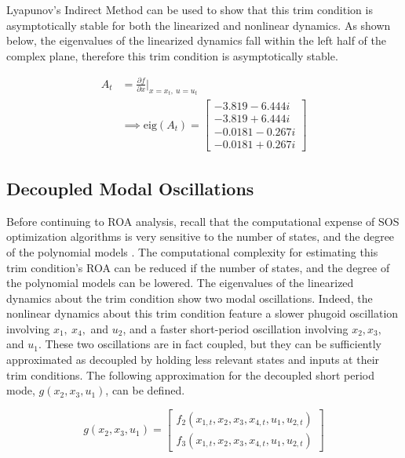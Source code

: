 \documentclass[%
 reprint,
 amsmath,amssymb,
 aps,
]{revtex4-2}
\begin{document}
Lyapunov's Indirect Method can be used to show that this trim condition is asymptotically stable for both the linearized and nonlinear dynamics. As shown below, the eigenvalues of the linearized dynamics fall within the left half of the complex plane, therefore this trim condition is asymptotically stable. 

\begin{align*}
    A_t &= \frac{\partial f}{\partial x}|_{x=x_t,\ u=u_t} \\
    & \implies \text{eig}(A_t) = 
        \begin{bmatrix}
            -3.819 - 6.444 i
            \\-3.819 + 6.444 i \\-0.0181 - 0.267 i \\ -0.0181 + 0.267 i
        \end{bmatrix} \tag{29}
\end{align*}

\subsection{Decoupled Modal Oscillations}

Before continuing to ROA analysis, recall that the computational expense of SOS optimization algorithms is very sensitive to the number of states, and the degree of the polynomial models \cite{primary}. The computational complexity for estimating this trim condition's ROA can be reduced if the number of states, and the degree of the polynomial models can be lowered. The eigenvalues of the linearized dynamics about the trim condition show two modal oscillations. Indeed, the nonlinear dynamics about this trim condition feature a slower phugoid oscillation involving $x_1,\ x_4,$ and $u_2$, and a faster short-period oscillation involving $x_2, x_3,$ and $u_1$\cite{primary}. These two oscillations are in fact coupled, but they can be sufficiently approximated as decoupled by holding less relevant states and inputs at their trim conditions. The following approximation for the decoupled short period mode, $g(x_2,x_3,u_1)$, can be defined.

\begin{equation*}
    g(x_2,x_3,u_1) = \begin{bmatrix} f_2(x_{1,t}, x_2, x_3, x_{4,t}, u_1, u_{2,t}) \\ f_3(x_{1,t}, x_2, x_3, x_{4,t}, u_1, u_{2,t}) \end{bmatrix} \tag{30}
\end{equation*} \\
\end{document}

